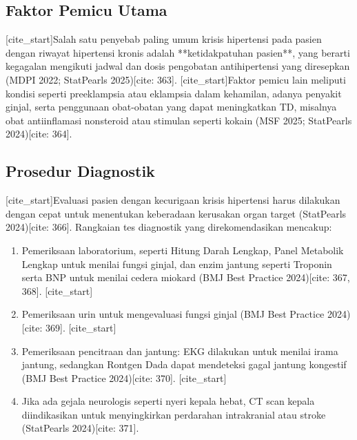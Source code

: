 \subsection{Faktor Pemicu Utama}
[cite_start]Salah satu penyebab paling umum krisis hipertensi pada pasien dengan riwayat hipertensi kronis adalah **ketidakpatuhan pasien**, yang berarti kegagalan mengikuti jadwal dan dosis pengobatan antihipertensi yang diresepkan (MDPI 2022; StatPearls 2025)[cite: 363]. [cite_start]Faktor pemicu lain meliputi kondisi seperti preeklampsia atau eklampsia dalam kehamilan, adanya penyakit ginjal, serta penggunaan obat-obatan yang dapat meningkatkan TD, misalnya obat antiinflamasi nonsteroid atau stimulan seperti kokain (MSF 2025; StatPearls 2024)[cite: 364].

\subsection{Prosedur Diagnostik}
[cite_start]Evaluasi pasien dengan kecurigaan krisis hipertensi harus dilakukan dengan cepat untuk menentukan keberadaan kerusakan organ target (StatPearls 2024)[cite: 366].
Rangkaian tes diagnostik yang direkomendasikan mencakup:
\begin{enumerate}
    \item Pemeriksaan laboratorium, seperti Hitung Darah Lengkap, Panel Metabolik Lengkap untuk menilai fungsi ginjal, dan enzim jantung seperti Troponin serta BNP untuk menilai cedera miokard (BMJ Best Practice 2024)[cite: 367, 368].
    [cite_start]\item Pemeriksaan urin untuk mengevaluasi fungsi ginjal (BMJ Best Practice 2024)[cite: 369].
    [cite_start]\item Pemeriksaan pencitraan dan jantung: EKG dilakukan untuk menilai irama jantung, sedangkan Rontgen Dada dapat mendeteksi gagal jantung kongestif (BMJ Best Practice 2024)[cite: 370].
    [cite_start]\item Jika ada gejala neurologis seperti nyeri kepala hebat, CT scan kepala diindikasikan untuk menyingkirkan perdarahan intrakranial atau stroke (StatPearls 2024)[cite: 371].
\end{enumerate}

